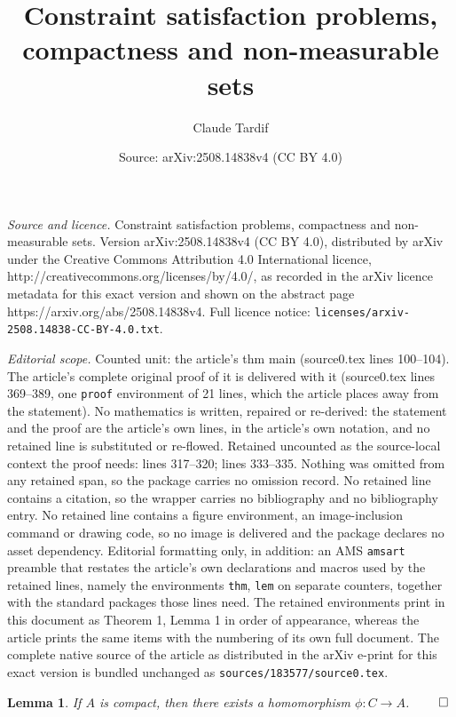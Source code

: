\documentclass[10pt,a4paper]{amsart}
\title{Constraint satisfaction problems, compactness and non-measurable sets}
\author{Claude Tardif}
\date{Source: arXiv:2508.14838v4 (CC BY 4.0)}
\newtheorem{lem}{Lemma}
\begin{document}
\maketitle

\noindent\emph{Source and licence.} Constraint satisfaction problems, compactness and non-measurable sets. Version arXiv:2508.14838v4 (CC BY 4.0), distributed by arXiv under the Creative Commons Attribution 4.0 International licence, http://creativecommons.org/licenses/by/4.0/, as recorded in the arXiv licence metadata for this exact version and shown on the abstract page https://arxiv.org/abs/2508.14838v4. Full licence notice: \texttt{licenses/arxiv-2508.14838-CC-BY-4.0.txt}.\par\smallskip

\noindent\textit{Editorial scope.} Counted unit: the article's thm main (source0.tex lines 100--104). The article's complete original proof of it is delivered with it (source0.tex lines 369--389, one \texttt{proof} environment of 21 lines, which the article places away from the statement). No mathematics is written, repaired or re-derived: the statement and the proof are the article's own lines, in the article's own notation, and no retained line is substituted or re-flowed.  Retained uncounted as the source-local context the proof needs: lines 317--320; lines 333--335.  Nothing was omitted from any retained span, so the package carries no omission record.  No retained line contains a citation, so the wrapper carries no bibliography and no bibliography entry.  No retained line contains a figure environment, an image-inclusion command or drawing code, so no image is delivered and the package declares no asset dependency.  Editorial formatting only, in addition: an AMS \texttt{amsart} preamble that restates the article's own declarations and macros used by the retained lines, namely the environments \texttt{thm}, \texttt{lem} on separate counters, together with the standard packages those lines need.  The retained environments print in this document as Theorem 1, Lemma 1 in order of appearance, whereas the article prints the same items with the numbering of its own full document.  The complete native source of the article as distributed in the arXiv e-print for this exact version is bundled unchanged as \texttt{sources/183577/source0.tex}.
\begin{lem} \label{compacthom}
If $A$ is compact, then there exists a homomorphism $\phi: C \rightarrow A$.
\hfill $\qed$
\end{lem}
\end{document}
